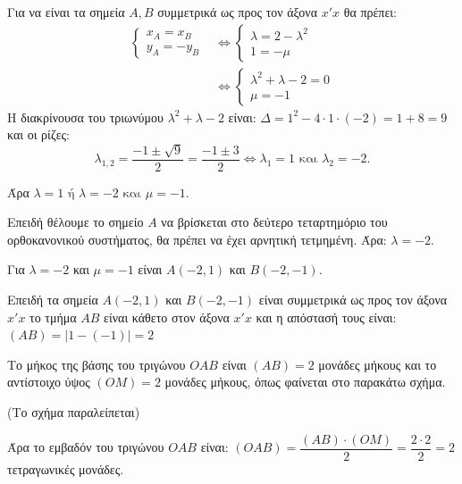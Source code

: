
\begin{alist}
\item Για να είναι τα σημεία $A, B$ συμμετρικά ως προς τον άξονα $x'x$ θα πρέπει:
\begin{align*}
\begin{cases}
x_A = x_B \\
y_A = -y_B
\end{cases} 
&\Leftrightarrow 
\begin{cases}
\lambda = 2 - \lambda^2 \\
1 = -\mu
\end{cases} \\
&\Leftrightarrow 
\begin{cases}
\lambda^2 + \lambda - 2 = 0 \\
\mu = -1
\end{cases}
\end{align*}
Η διακρίνουσα του τριωνύμου $\lambda^2 + \lambda - 2$ είναι:
$\Delta = 1^2 - 4 \cdot 1 \cdot (-2) = 1 + 8 = 9$ και οι ρίζες:
\[\lambda_{1,2} = \dfrac{-1 \pm \sqrt{9}}{2} = \dfrac{-1 \pm 3}{2} \Leftrightarrow \lambda_1 = 1 \text{ και } \lambda_2 = -2.\]

Άρα $\lambda = 1 \text{ ή } \lambda = -2 \text{ και } \mu = -1$.

\item Επειδή θέλουμε το σημείο $A$ να βρίσκεται στο δεύτερο τεταρτημόριο του ορθοκανονικού
συστήματος, θα πρέπει να έχει αρνητική τετμημένη.
Άρα: $\lambda = -2$.

\item Για $\lambda = -2$ και $\mu = -1$ είναι $A(-2, 1)$ και $B(-2, -1)$.
\begin{rlist}
\item Επειδή τα σημεία $A(-2, 1)$ και $B(-2, -1)$ είναι συμμετρικά ως προς τον άξονα $x'x$ το
τμήμα $AB$ είναι κάθετο στον άξονα $x'x$ και η απόστασή τους είναι:
$(AB) = |1 - (-1)| = 2$

\item Το μήκος της βάσης του τριγώνου $OAB$ είναι $(AB) = 2$ μονάδες μήκους και το
αντίστοιχο ύψος $(OM) = 2$ μονάδες μήκους, όπως φαίνεται στο παρακάτω σχήμα.

(Το σχήμα παραλείπεται)

Άρα το εμβαδόν του τριγώνου $OAB$ είναι:
$(OAB) = \dfrac{(AB) \cdot (OM)}{2} = \dfrac{2 \cdot 2}{2} = 2$ τετραγωνικές μονάδες.
\end{rlist}
\end{alist}

